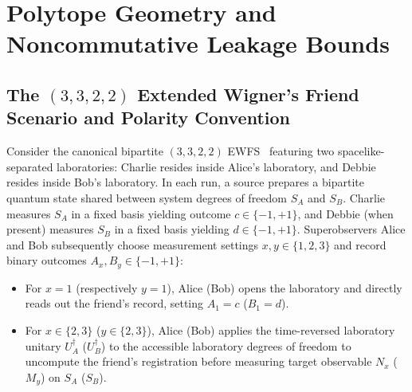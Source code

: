 \section{Polytope Geometry and Noncommutative Leakage Bounds}
\label{sec:polytope_bounds}

\subsection{The $(3,3,2,2)$ Extended Wigner's Friend Scenario and Polarity Convention}

Consider the canonical bipartite $(3,3,2,2)$ EWFS~\cite{bong2020} featuring two spacelike-separated laboratories: Charlie resides inside Alice's laboratory, and Debbie resides inside Bob's laboratory. In each run, a source prepares a bipartite quantum state shared between system degrees of freedom $S_A$ and $S_B$. Charlie measures $S_A$ in a fixed basis yielding outcome $c \in \{-1, +1\}$, and Debbie (when present) measures $S_B$ in a fixed basis yielding $d \in \{-1, +1\}$. Superobservers Alice and Bob subsequently choose measurement settings $x, y \in \{1, 2, 3\}$ and record binary outcomes $A_x, B_y \in \{-1, +1\}$:
\begin{itemize}
    \item For $x = 1$ (respectively $y = 1$), Alice (Bob) opens the laboratory and directly reads out the friend's record, setting $A_1 = c$ ($B_1 = d$).
    \item For $x \in \{2, 3\}$ ($y \in \{2, 3\}$), Alice (Bob) applies the time-reversed laboratory unitary $U_A^\dagger$ ($U_B^\dagger$) to the accessible laboratory degrees of freedom to uncompute the friend's registration before measuring target observable $N_x$ ($M_y$) on $S_A$ ($S_B$).
\end{itemize}

